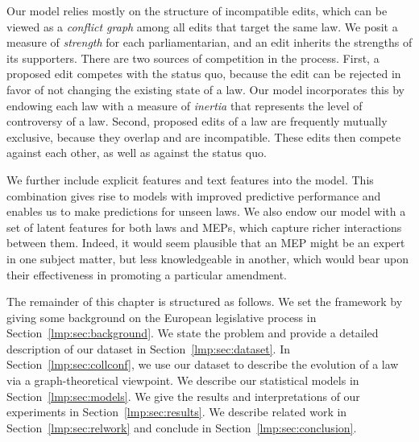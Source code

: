 Our model relies mostly on the structure of incompatible edits, which can be viewed as a {\em conflict graph} among all edits that target the same law.
We posit a measure of {\em strength} for each parliamentarian, and an edit inherits the strengths of its supporters.
There are two sources of competition in the process.
First, a proposed edit competes with the status quo, because the edit can be rejected in favor of not changing the existing state of a law.
Our model incorporates this by endowing each law with a measure of {\em inertia} that represents the level of controversy of a law.
Second, proposed edits of a law are frequently mutually exclusive, because they overlap and are incompatible.
These edits then compete against each other, as well as against the status quo.

We further include explicit features and text features into the model.
This combination gives rise to models with improved predictive performance and enables us to make predictions for unseen laws.
We also endow our model with a set of latent features for both laws and MEPs, which capture richer interactions between them.
Indeed, it would seem plausible that an MEP might be an expert in one subject matter, but less knowledgeable in another, which would bear upon their effectiveness in promoting a particular amendment.

The remainder of this chapter is structured as follows.
We set the framework by giving some background on the European legislative process in Section~\ref{lmp:sec:background}.
We state the problem and provide a detailed description of our dataset in Section~\ref{lmp:sec:dataset}.
In Section~\ref{lmp:sec:collconf}, we use our dataset to describe the evolution of a law via a graph-theoretical viewpoint.
We describe our statistical models in Section~\ref{lmp:sec:models}.
We give the results and interpretations of our experiments in Section~\ref{lmp:sec:results}.
We describe related work in Section~\ref{lmp:sec:relwork} and conclude in Section~\ref{lmp:sec:conclusion}.
